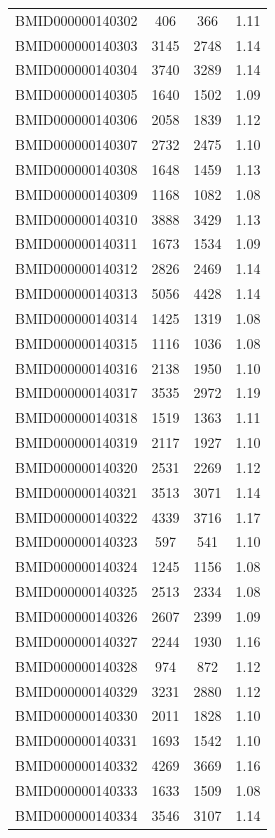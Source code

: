 \documentclass{bmcart}
\begin{document}
\begin{backmatter}
\begin{center}
\begin{longtable}{c|c|c|c}
BMID000000140302 & 406 & 366 & 1.11 \\
BMID000000140303 & 3145 & 2748 & 1.14 \\
BMID000000140304 & 3740 & 3289 & 1.14 \\
BMID000000140305 & 1640 & 1502 & 1.09 \\
BMID000000140306 & 2058 & 1839 & 1.12 \\
BMID000000140307 & 2732 & 2475 & 1.10\\
BMID000000140308 & 1648 & 1459 & 1.13 \\
BMID000000140309 & 1168 & 1082 & 1.08 \\
BMID000000140310 & 3888 & 3429 & 1.13 \\
BMID000000140311 & 1673 & 1534 & 1.09 \\
BMID000000140312 & 2826 & 2469 & 1.14 \\
BMID000000140313 & 5056 & 4428 & 1.14 \\
BMID000000140314 & 1425 & 1319 & 1.08 \\
BMID000000140315 & 1116 & 1036 & 1.08 \\
BMID000000140316 & 2138 & 1950 & 1.10\\
BMID000000140317 & 3535 & 2972 & 1.19 \\
BMID000000140318 & 1519 & 1363 & 1.11 \\
BMID000000140319 & 2117 & 1927 & 1.10\\
BMID000000140320 & 2531 & 2269 & 1.12 \\
BMID000000140321 & 3513 & 3071 & 1.14 \\
BMID000000140322 & 4339 & 3716 & 1.17 \\
BMID000000140323 & 597 & 541 & 1.10\\
BMID000000140324 & 1245 & 1156 & 1.08 \\
BMID000000140325 & 2513 & 2334 & 1.08 \\
BMID000000140326 & 2607 & 2399 & 1.09 \\
BMID000000140327 & 2244 & 1930 & 1.16 \\
BMID000000140328 & 974 & 872 & 1.12 \\
BMID000000140329 & 3231 & 2880 & 1.12 \\
BMID000000140330 & 2011 & 1828 & 1.10\\
BMID000000140331 & 1693 & 1542 & 1.10\\
BMID000000140332 & 4269 & 3669 & 1.16 \\
BMID000000140333 & 1633 & 1509 & 1.08 \\
BMID000000140334 & 3546 & 3107 & 1.14 \\

\end{longtable}
\end{center}
\end{backmatter}
\end{document}
